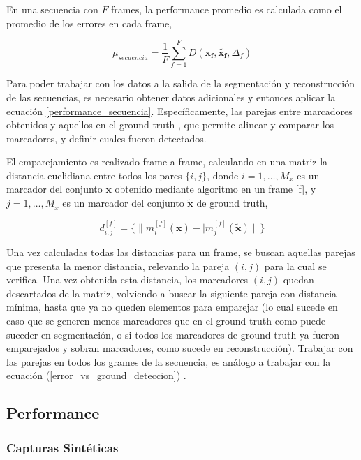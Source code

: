 En una secuencia con $F$ frames, la performance promedio es calculada como el promedio de los errores en cada frame,

\begin{equation}
\mu_{secuencia} = \frac{1}{F}\sum_{f=1}^{F} D(\boldsymbol{x_{f}},\boldsymbol{\tilde{x_{f}}},\Delta_{f})
\label{performance_secuencia}
\end{equation}

Para poder trabajar con los datos a la salida de la segmentación y reconstrucción de las secuencias, es necesario obtener datos adicionales y entonces aplicar la ecuación \ref{performance_secuencia}. Específicamente, las parejas entre marcadores obtenidos y aquellos en el ground truth , que permite alinear y comparar los marcadores, y definir cuales fueron detectados.

El emparejamiento es realizado frame a frame, calculando en una matriz la distancia euclidiana entre todos los pares $\{i,j\}$, donde $i=1,\ldots,M_{x}$ es un marcador del conjunto $\boldsymbol{x}$ obtenido mediante algoritmo en un frame [f], y $j=1,\ldots,M_{\tilde{x}}$ es un marcador del conjunto $\boldsymbol{\tilde{x}}$ de ground truth,

\begin{equation}
d_{i,j}^{[f]} = \{\|m_{i}^{[f]}(\boldsymbol{x})-|m_{j}^{[f]}(\boldsymbol{\tilde{x}})\|\}
\label{distancia_algoritmo_ground}
\end{equation}

Una vez calculadas todas las distancias para un frame, se buscan aquellas parejas que presenta la menor distancia, relevando la pareja $(i,j)$  para la cual se verifica. Una vez obtenida esta distancia, los marcadores $(i,j)$ quedan descartados de la matriz, volviendo a buscar la siguiente pareja con distancia mínima, hasta que ya no queden elementos para emparejar (lo cual sucede en caso que se generen menos marcadores que en el ground truth como puede suceder en segmentación, o si todos los marcadores de ground truth ya fueron emparejados y sobran marcadores, como sucede en reconstrucción). Trabajar con las parejas en todos los grames de la secuencia, es análogo a trabajar con la ecuación (\ref{error_vs_ground_deteccion}) .

\subsection{Performance}

\subsubsection{Capturas Sintéticas}

